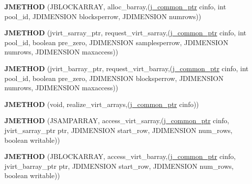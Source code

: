 \begin{DoxyCompactItemize}
\item 
\mbox{\label{structjpeg__memory__mgr_aefc8abe884dab5648c1e4e7ada2e2e18}} 
{\bfseries J\+M\+E\+T\+H\+OD} (J\+B\+L\+O\+C\+K\+A\+R\+R\+AY, alloc\+\_\+barray,(\hyperlink{structjpeg__common__struct}{j\+\_\+common\+\_\+ptr} cinfo, int pool\+\_\+id, J\+D\+I\+M\+E\+N\+S\+I\+ON blocksperrow, J\+D\+I\+M\+E\+N\+S\+I\+ON numrows))
\item 
\mbox{\label{structjpeg__memory__mgr_a34b830d9d7b2f4fd043e98421a700503}} 
{\bfseries J\+M\+E\+T\+H\+OD} (jvirt\+\_\+sarray\+\_\+ptr, request\+\_\+virt\+\_\+sarray,(\hyperlink{structjpeg__common__struct}{j\+\_\+common\+\_\+ptr} cinfo, int pool\+\_\+id, boolean pre\+\_\+zero, J\+D\+I\+M\+E\+N\+S\+I\+ON samplesperrow, J\+D\+I\+M\+E\+N\+S\+I\+ON numrows, J\+D\+I\+M\+E\+N\+S\+I\+ON maxaccess))
\item 
\mbox{\label{structjpeg__memory__mgr_aee93326ad6a64714443e90044614d2a6}} 
{\bfseries J\+M\+E\+T\+H\+OD} (jvirt\+\_\+barray\+\_\+ptr, request\+\_\+virt\+\_\+barray,(\hyperlink{structjpeg__common__struct}{j\+\_\+common\+\_\+ptr} cinfo, int pool\+\_\+id, boolean pre\+\_\+zero, J\+D\+I\+M\+E\+N\+S\+I\+ON blocksperrow, J\+D\+I\+M\+E\+N\+S\+I\+ON numrows, J\+D\+I\+M\+E\+N\+S\+I\+ON maxaccess))
\item 
\mbox{\label{structjpeg__memory__mgr_a35cc0c3b3ecbc7209cdc23b2255932d8}} 
{\bfseries J\+M\+E\+T\+H\+OD} (void, realize\+\_\+virt\+\_\+arrays,(\hyperlink{structjpeg__common__struct}{j\+\_\+common\+\_\+ptr} cinfo))
\item 
\mbox{\label{structjpeg__memory__mgr_a747ad4316a4794b13f9fdff4f6f699ca}} 
{\bfseries J\+M\+E\+T\+H\+OD} (J\+S\+A\+M\+P\+A\+R\+R\+AY, access\+\_\+virt\+\_\+sarray,(\hyperlink{structjpeg__common__struct}{j\+\_\+common\+\_\+ptr} cinfo, jvirt\+\_\+sarray\+\_\+ptr ptr, J\+D\+I\+M\+E\+N\+S\+I\+ON start\+\_\+row, J\+D\+I\+M\+E\+N\+S\+I\+ON num\+\_\+rows, boolean writable))
\item 
\mbox{\label{structjpeg__memory__mgr_aa460f4b500825e051306b8ce5583d052}} 
{\bfseries J\+M\+E\+T\+H\+OD} (J\+B\+L\+O\+C\+K\+A\+R\+R\+AY, access\+\_\+virt\+\_\+barray,(\hyperlink{structjpeg__common__struct}{j\+\_\+common\+\_\+ptr} cinfo, jvirt\+\_\+barray\+\_\+ptr ptr, J\+D\+I\+M\+E\+N\+S\+I\+ON start\+\_\+row, J\+D\+I\+M\+E\+N\+S\+I\+ON num\+\_\+rows, boolean writable))

\end{DoxyCompactItemize}
